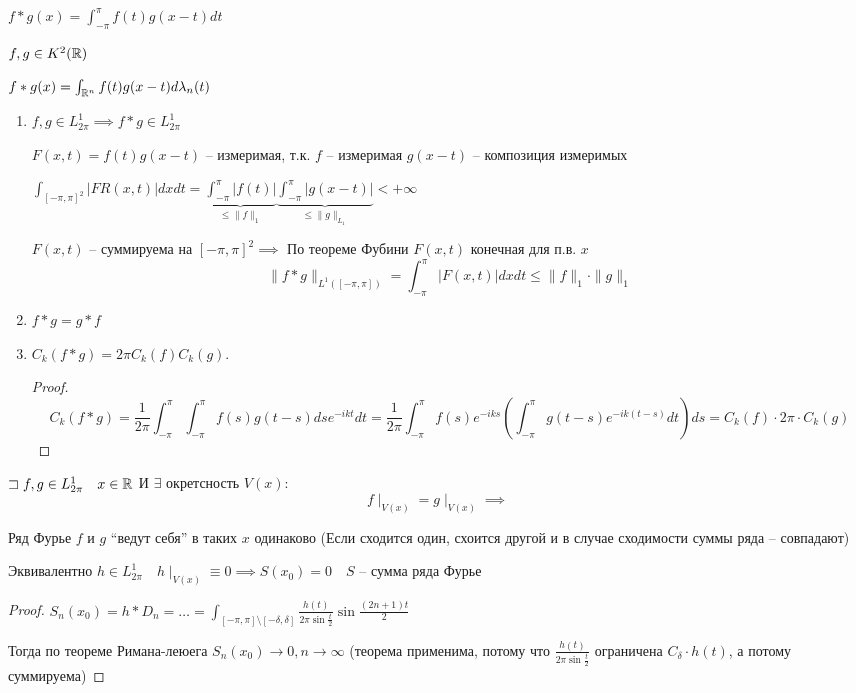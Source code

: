 \begin{definition}

    $f \ast g (x) = \int_{-\pi}^{\pi} f(t)g(x-t)dt$

    $f, g\in K^2(\mathbb{R})$

    $f\ast g(x) = \int_{\mathbb{R}^n} f(t)g(x-t) d\lambda_n(t)$
\end{definition}

\begin{property}
    \begin{enumerate}
        \item $f, g\in L^1_{2\pi} \implies f\ast g\in L^1_{2\pi}$

        $F(x,t) = f(t) g(x-t)$ -- измеримая, т.к. $f$ -- измеримая $g(x-t)$ -- композиция измеримых

        $\int_{\left[ -\pi, \pi \right]^2 } \left| FR(x,t) \right|dxdt = \underbrace{\int_{-\pi}^{\pi}|f(t)|}_{\leqslant \|f\|_1} \underbrace{\int_{-\pi}^{\pi} |g(x - t)|}_{\leqslant \|g\|_{L_1}} <+\infty  $

    $F(x,t)$ -- суммируема на $\left[ -\pi, \pi \right] ^2 \implies $ По теореме Фубини $F(x,t)$ конечная для п.в. $x$
    \[\|f\ast g\|_{L^1([-\pi, \pi])} = \int_{-\pi}^{\pi} |F(x,t)|dxdt \leqslant \|f\|_1 \cdot \|g\|_1\]
    \item $f\ast g = g\ast f$

    \item $C_k(f \ast g) = 2\pi C_k (f) C_k(g)$.
    \begin{proof}
        \[ C_k(f \ast g) = \dfrac{1}{2\pi}\int_{-\pi}^\pi \int_{-\pi}^\pi f(s) g(t - s) ds e^{-ikt} dt = \dfrac{1}{2\pi} \int_{-\pi}^\pi f(s) e^{-iks} \left( \int_{-\pi}^\pi g(t - s) e^{-ik (t -s) } dt \right) ds = C_k(f) \cdot 2\pi \cdot C_k(g) \]
    \end{proof}
\end{enumerate}

\begin{theorem}

    $\sqsupset f, g\in L^1_{2\pi}\quad x\in \mathbb{R}$ И $\exists $ окретсность $V(x):$
    \[f\mid_{V(x)} = g\mid_{V(x)} \implies \]

    Ряд Фурье $f$ и $g$ ``ведут себя'' в таких $x$ одинаково (Если сходится один, схоится другой и в случае сходимости суммы ряда -- совпадают)

    Эквивалентно $h\in L^1_{2\pi}\quad h\mid_{V(x)}\equiv 0 \implies S(x_0) = 0\quad S$ -- сумма ряда Фурье
\end{theorem}
\begin{proof}
    $S_n(x_0)= h \ast D_n= \ldots = \int_{[-\pi, \pi]\setminus [-\delta, \delta]}\frac{h(t)}{2\pi\sin \frac{t}{2}} \sin \frac{(2n+1)t}{2}$

    Тогда по теореме Римана-леюега $S_n(x_0) \to 0, n\to \infty $ (теорема применима, потому что  $\frac{h(t)}{2\pi \sin \frac{t}{2}}$ ограничена $C_\delta\cdot h(t)$, а потому суммируема)
\end{proof}

\end{property}

